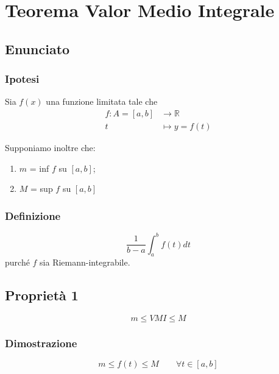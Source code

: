 \documentclass[../dimostrazioni]{subfiles}
\begin{document}
    \chapter{Teorema Valor Medio Integrale}
    \label{teoValorMedioIntegrale}

    \section*{Enunciato}

        \subsection*{Ipotesi}

            Sia \(f(x)\) una funzione limitata tale che
            \begin{align*}
                f : A = [a, b] &\longrightarrow \mathbb{R}\\
                t &\longmapsto y = f(t) 
            \end{align*}

            Supponiamo inoltre che:

                \begin{enumerate}
                    \indentitem \item \(m\) = inf \(f\) su \([a, b]\);
                    \indentitem \item \(M\) = sup \(f\) su \([a, b]\)
                \end{enumerate}  

        \subsection*{Definizione}

            \[ \frac{1}{b-a} \int_{a}^{b} f(t)dt \]
            purché \(f\) sia Riemann-integrabile.

    \section*{Proprietà 1}

        \[ m \leqslant VMI \leqslant M \]

        \subsection*{Dimostrazione}
    
            \[m \leqslant f(t) \leqslant M  \qquad \forall t \in [a, b] \]
\end{document}
